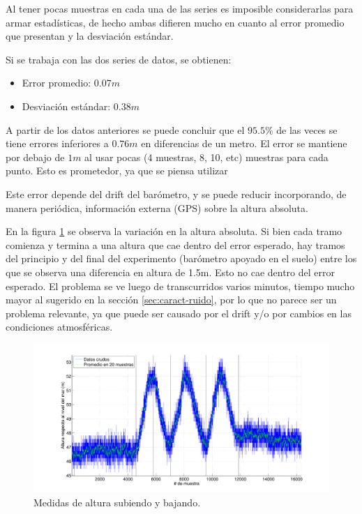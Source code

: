 \documentclass[main]{subfiles}
\begin{document}
Al tener pocas muestras en cada una de las series es imposible considerarlas para armar estadísticas, de hecho ambas difieren mucho en cuanto al error promedio que presentan y la desviación estándar. 

Si se trabaja con las dos series de datos, se obtienen:

\begin{itemize}
\item Error promedio: $0.07m$
\item Desviación estándar: $0.38m$
\end{itemize}

A partir de los datos anteriores se puede concluir que el $95.5 \%$ de las veces se tiene errores inferiores a $0.76m$ en diferencias de un metro. El error se mantiene por debajo de $1m$ al usar pocas (4 muestras, 8, 10, etc) muestras para cada punto. Esto es prometedor, ya que se piensa utilizar 

Este error depende del drift del barómetro, y se puede reducir incorporando, de manera periódica, información externa (GPS) sobre la altura absoluta.

En la figura \ref{fig:variando} se observa la variación en la altura absoluta. Si bien cada tramo comienza y termina a una altura que cae dentro del error esperado, hay tramos del principio y del final del experimento (barómetro apoyado en el suelo) entre los que se observa una diferencia en altura de 1.5m. Esto no cae dentro del error esperado. El problema se ve luego de transcurridos varios minutos, tiempo mucho mayor al sugerido en la sección \ref{sec:caract-ruido}, por lo que no parece ser un problema relevante, ya que puede ser causado por el drift y/o por cambios en las condiciones atmosféricas.

\begin{figure}[H]
\hspace{-70pt}
  \includegraphics[width=1.3\textwidth]{./pics_barom/variando.pdf}
  \caption{Medidas de altura subiendo y bajando.}
  \label{fig:variando}
\end{figure}
\end{document}
